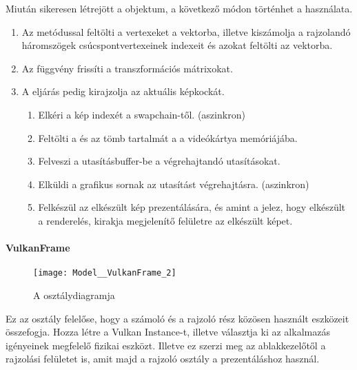 Miut\'an sikeresen l\'etrej\"ott a  objektum, a k\"ovetkez\H o m\'odon t\"ort\'enhet a haszn\'alata.
\begin{enumerate}
	\item Az  met\'odussal felt\"olti a vertexeket a  vektorba, illetve kisz\'amolja a rajzoland\'o h\'aromsz\"ogek cs\'ucspontvertexeinek indexeit \'es azokat felt\"olti az  vektorba.
	\item Az  f\"uggv\'eny friss\'iti a transzform\'aci\'os m\'atrixokat.
	\item A  elj\'ar\'as pedig kirajzolja az aktu\'alis k\'epkock\'at.
		\begin{enumerate}
			\item Elk\'eri a k\'ep index\'et a swapchain-t\H ol. (aszinkron)
			\item Felt\"olti a  \'es az  t\"omb tartalm\'at a a vide\'ok\'artya mem\'ori\'aj\'aba.
			\item Felveszi a utas\'it\'asbuffer-be a v\'egrehajtand\'o utas\'it\'asokat.
			\item Elk\"uldi a grafikus sornak az utas\'it\'ast v\'egrehajt\'asra. (aszinkron)
			\item Felk\'esz\"ul az elk\'esz\"ult k\'ep prezent\'al\'as\'ara, \'es amint a  jelez, hogy elk\'esz\"ult a renderel\'es, kirakja megjelen\'it\H o fel\"uletre az elk\'esz\"ult k\'epet.
		\end{enumerate}
\end{enumerate}

\paragraph{VulkanFrame}
\begin{figure}[h]
	\texttt{[image: Model\_\_VulkanFrame\_2]}
	\centering
	\caption{A  oszt\'alydiagramja}
\end{figure}
Ez az oszt\'aly felel\H ose, hogy a sz\'amol\'o \'es a rajzol\'o r\'esz k\"oz\"osen haszn\'alt eszk\"ozeit \"osszefogja. Hozza l\'etre a Vulkan Instance-t, illetve v\'alasztja ki az alkalmaz\'as ig\'enyeinek megfelel\H o fizikai eszk\"ozt. Illetve ez szerzi meg az ablakkezel\H ot\H ol a rajzol\'asi fel\"uletet is, amit majd a rajzol\'o oszt\'aly a prezent\'al\'ashoz haszn\'al.